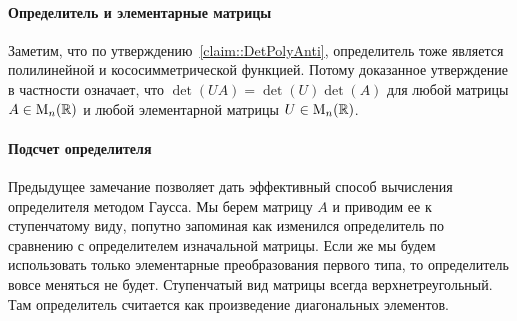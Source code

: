 \paragraph{Определитель и элементарные матрицы}

Заметим, что по утверждению~\ref{claim::DetPolyAnti}, определитель тоже является полилинейной и кососимметрической функцией.
Потому доказанное утверждение в частности означает, что $\det(UA) = \det(U)\det(A)$ для любой матрицы $A\in\operatorname{M}_{n}(\mathbb R)$ и любой элементарной матрицы $U\in\operatorname{M}_{n}(\mathbb R)$.

\paragraph{Подсчет определителя}

Предыдущее замечание позволяет дать эффективный способ вычисления определителя методом Гаусса.
Мы берем матрицу $A$ и приводим ее к ступенчатому виду, попутно запоминая как изменился определитель по сравнению с определителем изначальной матрицы.
Если же мы будем использовать только элементарные преобразования первого типа, то определитель вовсе меняться не будет.
Ступенчатый вид матрицы всегда верхнетреугольный.
Там определитель считается как произведение диагональных элементов.
